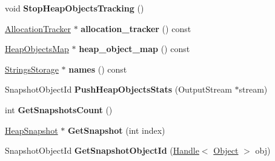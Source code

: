 \begin{DoxyCompactItemize}
\item 
\hypertarget{classv8_1_1internal_1_1_heap_profiler_a4ee8e40dc2d3ef72428da51cb7eafdee}{}void {\bfseries Stop\+Heap\+Objects\+Tracking} ()\label{classv8_1_1internal_1_1_heap_profiler_a4ee8e40dc2d3ef72428da51cb7eafdee}

\item 
\hypertarget{classv8_1_1internal_1_1_heap_profiler_a394aa6391103de6cb286676afab8382b}{}\hyperlink{classv8_1_1internal_1_1_allocation_tracker}{Allocation\+Tracker} $\ast$ {\bfseries allocation\+\_\+tracker} () const \label{classv8_1_1internal_1_1_heap_profiler_a394aa6391103de6cb286676afab8382b}

\item 
\hypertarget{classv8_1_1internal_1_1_heap_profiler_aa171a49c462515a4a41252f41d7533d5}{}\hyperlink{classv8_1_1internal_1_1_heap_objects_map}{Heap\+Objects\+Map} $\ast$ {\bfseries heap\+\_\+object\+\_\+map} () const \label{classv8_1_1internal_1_1_heap_profiler_aa171a49c462515a4a41252f41d7533d5}

\item 
\hypertarget{classv8_1_1internal_1_1_heap_profiler_ae02c1a69bde63936715ab463f1e4962c}{}\hyperlink{classv8_1_1internal_1_1_strings_storage}{Strings\+Storage} $\ast$ {\bfseries names} () const \label{classv8_1_1internal_1_1_heap_profiler_ae02c1a69bde63936715ab463f1e4962c}

\item 
\hypertarget{classv8_1_1internal_1_1_heap_profiler_a905d3759618720e81ac0dd066c7d57b6}{}Snapshot\+Object\+Id {\bfseries Push\+Heap\+Objects\+Stats} (Output\+Stream $\ast$stream)\label{classv8_1_1internal_1_1_heap_profiler_a905d3759618720e81ac0dd066c7d57b6}

\item 
\hypertarget{classv8_1_1internal_1_1_heap_profiler_a674d9a5803aa04e8c5091289aae7d562}{}int {\bfseries Get\+Snapshots\+Count} ()\label{classv8_1_1internal_1_1_heap_profiler_a674d9a5803aa04e8c5091289aae7d562}

\item 
\hypertarget{classv8_1_1internal_1_1_heap_profiler_a6e1700f861f6260c7e2ecc53c6b7f53b}{}\hyperlink{classv8_1_1internal_1_1_heap_snapshot}{Heap\+Snapshot} $\ast$ {\bfseries Get\+Snapshot} (int index)\label{classv8_1_1internal_1_1_heap_profiler_a6e1700f861f6260c7e2ecc53c6b7f53b}

\item 
\hypertarget{classv8_1_1internal_1_1_heap_profiler_aec86d7e69472ced74bd92574696b4a0e}{}Snapshot\+Object\+Id {\bfseries Get\+Snapshot\+Object\+Id} (\hyperlink{classv8_1_1internal_1_1_handle}{Handle}$<$ \hyperlink{classv8_1_1internal_1_1_object}{Object} $>$ obj)\label{classv8_1_1internal_1_1_heap_profiler_aec86d7e69472ced74bd92574696b4a0e}


\end{DoxyCompactItemize}
